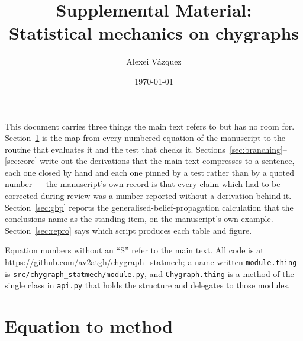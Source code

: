 \documentclass[aps,pre,onecolumn,superscriptaddress,floatfix,nofootinbib]{revtex4-2}
\newcommand{\code}[1]{\texttt{#1}}
\begin{document}
\title{Supplemental Material:\\ Statistical mechanics on chygraphs}

\author{Alexei V\'azquez}

\date{\today}

\maketitle

This document carries three things the main text refers to but has no room for.
Section~\ref{sec:map} is the map from every numbered equation of the manuscript
to the routine that evaluates it and the test that checks it.
Sections~\ref{sec:branching}--\ref{sec:core} write out the derivations that the
main text compresses to a sentence, each one closed by hand and each one pinned
by a test rather than by a quoted number --- the manuscript's own record is that
every claim which had to be corrected during review was a number reported
without a derivation behind it. Section~\ref{sec:gbp} reports the
generalised-belief-propagation calculation that the conclusions name as the
standing item, on the manuscript's own example.
Section~\ref{sec:repro} says which script produces each table and figure.

Equation numbers without an ``S'' refer to the main text. All code is at
\url{https://github.com/av2atgh/chygraph_statmech}; a name written
\code{module.thing} is \code{src/chygraph\_statmech/module.py}, and
\code{Chygraph.thing} is a method of the single class in \code{api.py} that
holds the structure and delegates to those modules.

\section{Equation to method}
\label{sec:map}
\end{document}
